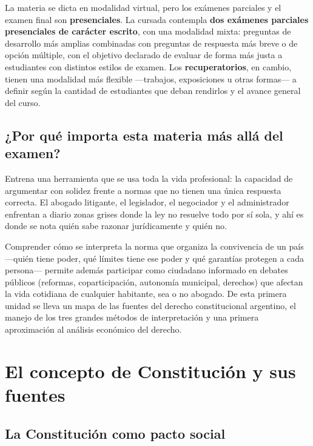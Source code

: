 \documentclass[12pt,oneside]{book}
\begin{document}
La materia se dicta en modalidad virtual, pero los exámenes parciales y el examen final son \textbf{presenciales}. La cursada contempla \textbf{dos exámenes parciales presenciales de carácter escrito}, con una modalidad mixta: preguntas de desarrollo más amplias combinadas con preguntas de respuesta más breve o de opción múltiple, con el objetivo declarado de evaluar de forma más justa a estudiantes con distintos estilos de examen. Los \textbf{recuperatorios}, en cambio, tienen una modalidad más flexible ---trabajos, exposiciones u otras formas--- a definir según la cantidad de estudiantes que deban rendirlos y el avance general del curso.

\section{¿Por qué importa esta materia más allá del examen?}

Entrena una herramienta que se usa toda la vida profesional: la capacidad de argumentar con solidez frente a normas que no tienen una única respuesta correcta. El abogado litigante, el legislador, el negociador y el administrador enfrentan a diario zonas grises donde la ley no resuelve todo por sí sola, y ahí es donde se nota quién sabe razonar jurídicamente y quién no.

Comprender cómo se interpreta la norma que organiza la convivencia de un país ---quién tiene poder, qué límites tiene ese poder y qué garantías protegen a cada persona--- permite además participar como ciudadano informado en debates públicos (reformas, coparticipación, autonomía municipal, derechos) que afectan la vida cotidiana de cualquier habitante, sea o no abogado. De esta primera unidad se lleva un mapa de las fuentes del derecho constitucional argentino, el manejo de los tres grandes métodos de interpretación y una primera aproximación al análisis económico del derecho.

\chapter[El concepto de Constitución]{El concepto de Constitución y sus fuentes}

\section{La Constitución como pacto social}
\end{document}

